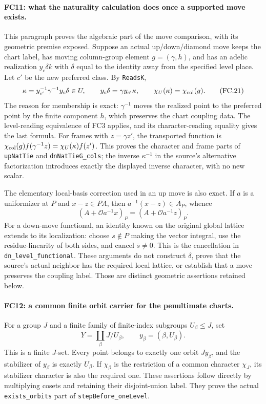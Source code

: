 \documentclass[11pt,a4paper]{article}
\numberwithin{equation}{section}
\theoremstyle{remark}\newtheorem{remark}[theorem]{Remark}
\begin{document}
\paragraph{FC11: what the naturality calculation does once a supported
move exists.}
This paragraph proves the algebraic part of the move comparison, with
its geometric premise exposed. Suppose an actual up/down/diamond move
keeps the chart label, has moving column-group element $g=(\gamma,h)$,
and has an adelic realization $y_c\delta k$ with $\delta$ equal to
the identity away from the specified level place. Let $c'$ be the
new preferred class. By \texttt{ReadsK},
\[
 \kappa=y_{c'}^{-1}\gamma^{-1}y_c\delta\in U,\qquad
 y_c\delta=\gamma y_{c'}\kappa,
 \qquad \chi_U(\kappa)=\chi_{\rm col}(g).              \tag{FC.21}
\]
The reason for membership is exact: $\gamma^{-1}$ moves the realized
point to the preferred point by the finite component $h$, which
preserves the chart coupling data. The level-reading equivalence of
FC3 applies, and its character-reading equality gives the last formula.
For frames with $z=\gamma z'$, the transported function is
$\chi_{\rm col}(g)f(\gamma^{-1}z)=\chi_U(\kappa)f(z')$.
This proves the character and frame parts of \texttt{upNatTie} and
\texttt{dnNatTieG\_\allowbreak cols}; the inverse $\kappa^{-1}$ in the source's
alternative factorization introduces exactly the displayed inverse
character, with no new scalar.

The elementary local-basis correction used in an up move is also exact.
If $a$ is a uniformizer at $P$ and $x-z\in PA$, then
$a^{-1}(x-z)\in A_P$, whence
\[
 (A+\mathcal Oa^{-1}x)_P=(A+\mathcal Oa^{-1}z)_P.
 \tag{FC.22}
\]
For a down-move functional, an identity known on the original global
lattice extends to its localization: choose $s\notin P$ making the
vector integral, use the residue-linearity of both sides, and cancel
$\bar s\ne0$. This is the cancellation in
\texttt{dn\_\allowbreak level\_\allowbreak functional}. These arguments do not construct
$\delta$, prove that the source's actual neighbor has the required
local lattice, or establish that a move preserves the coupling label.
Those are distinct geometric assertions retained below.

\paragraph{FC12: a common finite orbit carrier for the penultimate
charts.}
For a group $J$ and a finite family of finite-index subgroups
$U_\beta\le J$, set
\[
 Y=\coprod_\beta J/U_\beta,\qquad y_\beta=(\beta,U_\beta).
 \tag{FC.23}
\]
This is a finite $J$-set. Every point belongs to exactly one orbit
$J y_\beta$, and the stabilizer of $y_\beta$ is exactly $U_\beta$.
If $\chi_\beta$ is the restriction of a common character $\chi_J$,
its stabilizer character is also the required one. These assertions
follow directly by multiplying cosets and retaining their disjoint-union
label. They prove the actual \texttt{exists\_\allowbreak orbits} part of
\texttt{stepBefore\_\allowbreak oneLevel}.
\end{document}
